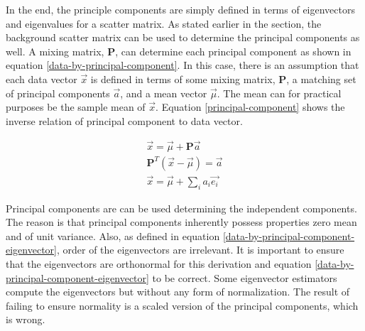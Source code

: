 \documentclass[11pt]{article}
\begin{document}
In the end, the principle components are simply defined in terms of eigenvectors and  eigenvalues for a scatter matrix.  
As stated earlier in the section, the background scatter matrix can be used to determine the principal components as well.  A mixing matrix, $\mathbf{P}$, can determine each principal component as shown in equation \ref{data-by-principal-component}.   %
In this case, there is an assumption that each data vector $\vec{x}$ is defined in terms of some mixing matrix, $\mathbf{P}$, a matching set of principal components $\vec{a}$, and a mean vector $\vec{\mu}$.   The mean can for practical purposes be the sample mean of $\vec{x}$.  
Equation \ref{principal-component} shows the inverse relation of principal component to data vector.  %

\begin{eqnarray}
\vec{x} = \vec{\mu} + \mathbf{P}\vec{a} \label{data-by-principal-component} \\
\mathbf{P}^T(\vec{x} -\vec{\mu}) = \vec{a} \label{principal-component} \\
\vec{x} = \vec{\mu} + \sum _i a_i \vec{e_i} \label{data-by-principal-component-eigenvector} 
\end{eqnarray}


Principal components are can be used %
determining the independent components.  The reason is that principal components inherently possess properties zero mean and of unit variance.  Also, as defined in equation \ref{data-by-principal-component-eigenvector}, order of the eigenvectors are irrelevant.  %
It is important to ensure that the eigenvectors are orthonormal for this derivation and equation \ref{data-by-principal-component-eigenvector} to be correct.  Some eigenvector estimators compute the eigenvectors but without any form of normalization.  The result of failing to ensure normality is a scaled version of the principal components, which is wrong.  
\end{document}
